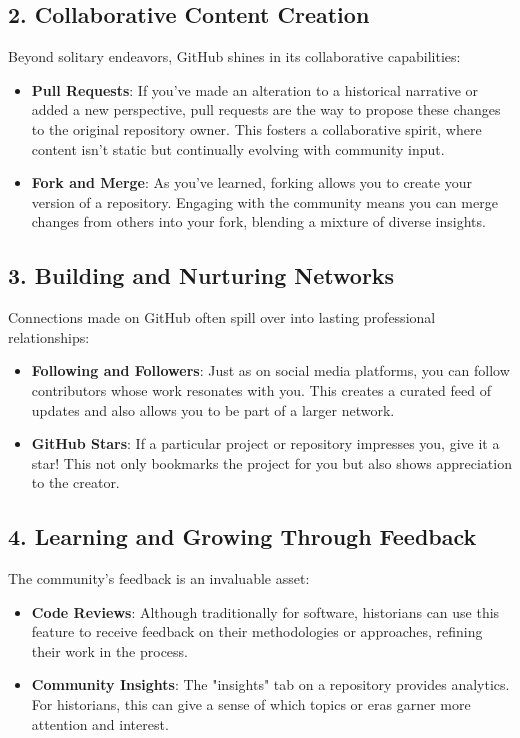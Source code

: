 \documentclass[a4paper,12pt]{book}
\begin{document}
\subsection*{2. Collaborative Content Creation}
Beyond solitary endeavors, GitHub shines in its collaborative capabilities:

\begin{itemize}
    \item \textbf{Pull Requests}: If you've made an alteration to a historical narrative or added a new perspective, pull requests are the way to propose these changes to the original repository owner. This fosters a collaborative spirit, where content isn't static but continually evolving with community input.
    \item \textbf{Fork and Merge}: As you've learned, forking allows you to create your version of a repository. Engaging with the community means you can merge changes from others into your fork, blending a mixture of diverse insights.
\end{itemize}

\subsection*{3. Building and Nurturing Networks}
Connections made on GitHub often spill over into lasting professional relationships:

\begin{itemize}
    \item \textbf{Following and Followers}: Just as on social media platforms, you can follow contributors whose work resonates with you. This creates a curated feed of updates and also allows you to be part of a larger network.
    \item \textbf{GitHub Stars}: If a particular project or repository impresses you, give it a star! This not only bookmarks the project for you but also shows appreciation to the creator.
\end{itemize}

\subsection*{4. Learning and Growing Through Feedback}
The community's feedback is an invaluable asset:

\begin{itemize}
    \item \textbf{Code Reviews}: Although traditionally for software, historians can use this feature to receive feedback on their methodologies or approaches, refining their work in the process.
    \item \textbf{Community Insights}: The "insights" tab on a repository provides analytics. For historians, this can give a sense of which topics or eras garner more attention and interest.
\end{itemize}
\end{document}

